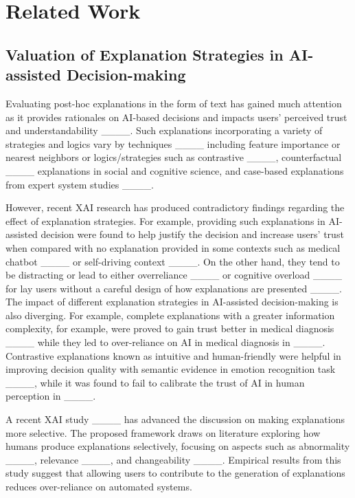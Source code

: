 \section{Related Work}
\label{sec:related-work}

\subsection{Valuation of Explanation Strategies in AI-assisted Decision-making}
\label{sec:related-work-exp}

Evaluating post-hoc explanations in the form of text has gained much attention as it provides rationales on AI-based decisions and impacts users' perceived trust and understandability  ____. Such explanations incorporating a variety of strategies and logics vary by techniques ____ including feature importance or nearest neighbors or logics/strategies such as contrastive ____, counterfactual ____ explanations in social and cognitive science, and case-based explanations from expert system studies ____. 

However, recent XAI research has produced contradictory findings regarding the effect of explanation strategies. For example, providing such explanations in AI-assisted decision were found to help justify the decision and increase users' trust when compared with no explanation provided in some contexts such as medical chatbot ____ or self-driving context ____. On the other hand, they tend to be distracting or lead to either overreliance ____ or cognitive overload ____ for lay users without a careful design of how explanations are presented ____. 
The impact of different explanation strategies in AI-assisted decision-making is also diverging. For example, complete explanations with a greater information complexity, for example, were proved to gain trust better in medical diagnosis ____ while they led to over-reliance on AI in medical diagnosis in ____. Contrastive explanations known as intuitive and human-friendly were helpful in improving decision quality with semantic evidence in emotion recognition task ____, while it was found to fail to calibrate the trust of AI in human perception in ____.

A recent XAI study ____ has advanced the discussion on making explanations more selective. The proposed framework draws on literature exploring how humans produce explanations selectively, focusing on aspects such as abnormality ____, relevance ____, and changeability ____. Empirical results from this study suggest that allowing users to contribute to the generation of explanations reduces over-reliance on automated systems.

